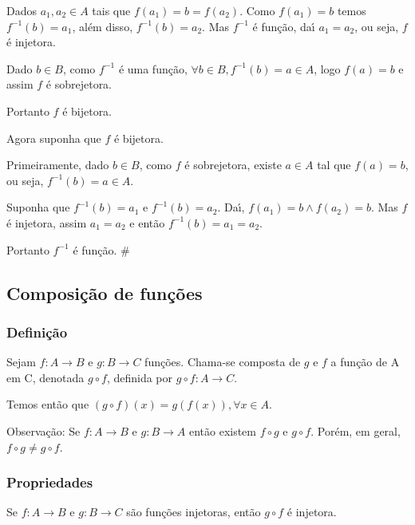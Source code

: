 Dados $a_{1},a_{2}\in A$ tais que $f(a_{1})=b=f(a_{2})$. Como $f(a_{1})=b$ temos $f^{-1}(b)=a_{1}$, al{\'e}m disso, $f^{-1}(b)=a_{2}$. Mas $f^{-1}$ {\'e} fun{\c c}{\~a}o, da{\'\i} $a_{1}=a_{2}$, ou seja, $f$ {\'e} injetora.

Dado $b\in B$, como $f^{-1}$ {\'e} uma fun{\c c}{\~a}o, $\forall b\in B, f^{-1}(b)=a\in A$, logo $f(a)=b$ e assim $f$ {\'e} sobrejetora.

Portanto $f$ {\'e} bijetora.

Agora suponha que $f$ {\'e} bijetora.

Primeiramente, dado $b\in B$, como $f$ {\'e} sobrejetora, existe $a\in A$ tal que $f(a)=b$, ou seja, $f^{-1}(b)=a\in A$.

Suponha que $f^{-1}(b)=a_{1}$ e $f^{-1}(b)=a_{2}$. Da{\'\i}, $f(a_{1})=b\wedge f(a_{2})=b$. Mas $f$ {\'e} injetora, assim $a_{1}=a_{2}$ e ent{\~a}o $f^{-1}(b)=a_{1}=a_{2}$.

Portanto $f^{-1}$ {\'e} fun{\c c}{\~a}o. \#
\subsection{Composi{\c c}{\~a}o de fun{\c c}{\~o}es}

\subsubsection{Defini{\c c}{\~a}o}

\begin{definicao} Sejam $f:A\rightarrow B$ e $g:B\rightarrow C$ fun{\c c}{\~o}es. Chama-se composta de $g$ e $f$ a fun{\c c}{\~a}o de A em C, denotada $g\circ f$, definida por $g\circ f:A\rightarrow C$.\end{definicao}

Temos ent{\~a}o que $(g\circ f)(x)=g(f(x)), \forall x\in A$.

Observa{\c c}{\~a}o: Se $f:A\rightarrow B$ e $g:B\rightarrow A$ ent{\~a}o existem $f\circ g$ e $g\circ f$. Por{\'e}m, em geral, $f\circ g\neq g\circ f$.

\subsubsection{Propriedades}
\begin{proposicao} Se $f:A\rightarrow B$ e $g:B\rightarrow C$ s{\~a}o fun{\c c}{\~o}es injetoras, ent{\~a}o $g\circ f$ {\'e} injetora.\end{proposicao}

